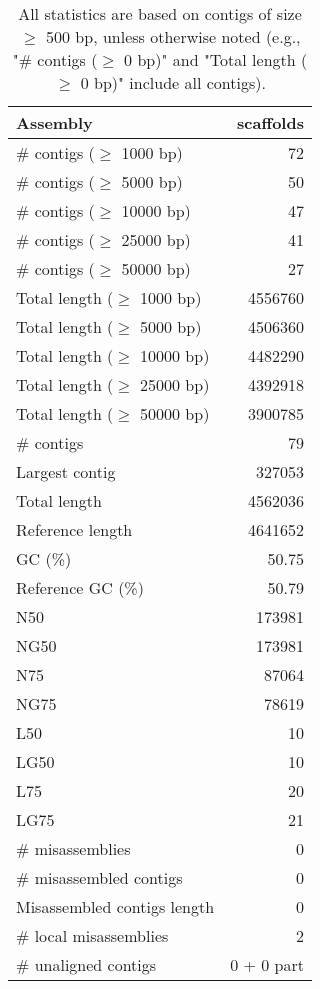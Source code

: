 \documentclass[12pt,a4paper]{article}
\begin{document}
\begin{table}[ht]
\begin{center}
\caption{All statistics are based on contigs of size $\geq$ 500 bp, unless otherwise noted (e.g., "\# contigs ($\geq$ 0 bp)" and "Total length ($\geq$ 0 bp)" include all contigs).}
\begin{tabular}{|l*{1}{|r}|}
\hline
Assembly & scaffolds \\ \hline
\# contigs ($\geq$ 1000 bp) & 72 \\ \hline
\# contigs ($\geq$ 5000 bp) & 50 \\ \hline
\# contigs ($\geq$ 10000 bp) & 47 \\ \hline
\# contigs ($\geq$ 25000 bp) & 41 \\ \hline
\# contigs ($\geq$ 50000 bp) & 27 \\ \hline
Total length ($\geq$ 1000 bp) & 4556760 \\ \hline
Total length ($\geq$ 5000 bp) & 4506360 \\ \hline
Total length ($\geq$ 10000 bp) & 4482290 \\ \hline
Total length ($\geq$ 25000 bp) & 4392918 \\ \hline
Total length ($\geq$ 50000 bp) & 3900785 \\ \hline
\# contigs & 79 \\ \hline
Largest contig & 327053 \\ \hline
Total length & 4562036 \\ \hline
Reference length & 4641652 \\ \hline
GC (\%) & 50.75 \\ \hline
Reference GC (\%) & 50.79 \\ \hline
N50 & 173981 \\ \hline
NG50 & 173981 \\ \hline
N75 & 87064 \\ \hline
NG75 & 78619 \\ \hline
L50 & 10 \\ \hline
LG50 & 10 \\ \hline
L75 & 20 \\ \hline
LG75 & 21 \\ \hline
\# misassemblies & 0 \\ \hline
\# misassembled contigs & 0 \\ \hline
Misassembled contigs length & 0 \\ \hline
\# local misassemblies & 2 \\ \hline
\# unaligned contigs & 0 + 0 part \\ \hline

\end{tabular}
\end{center}
\end{table}
\end{document}
